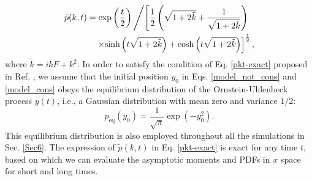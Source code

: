 \documentclass[aps,pre,twocolumn,groupedaddress,longbibliography]{revtex4-2}
\begin{document}
\begin{equation}\label{pkt-exact}
\begin{split}
    \tilde{p}(k,t)&=\exp\left(\frac{t}{2}\right)\left/\left[\frac{1}{2}\left(\sqrt{1+2\tilde{k}}+\frac{1}{\sqrt{1+2\tilde{k}}}\right)\right.\right.\\
&~~~\left.\times\textrm{sinh}\left(t\sqrt{1+2\tilde{k}}\right)
+\textrm{cosh}\left(t\sqrt{1+2\tilde{k}}\right)\right]^{\frac{1}{2}},
\end{split}
\end{equation}
where $\tilde{k}=ikF+k^2$. In order to satisfy the condition of Eq. \eqref{pkt-exact} proposed in Ref. \cite{Dankel:1991}, we assume that the initial position $y_0$ in Eqs. \eqref{model_not_cons} and \eqref{model_cons} obeys the equilibrium distribution of the Ornstein-Uhlenbeck process $y(t)$, i.e., a Gaussian distribution with mean zero and variance $1/2$:
\begin{equation}\label{EquilibriumDistribution}
  p_{\textrm{eq}}(y_0)=\frac{1}{\sqrt{\pi}}\exp(-y_0^2).
\end{equation}
This equilibrium distribution is also employed throughout all the simulations in Sec. \ref{Sec6}.
The expression of $\tilde{p}(k,t)$ in Eq. \eqref{pkt-exact} is exact for any time $t$, based on which we can evaluate the asymptotic moments and PDFs in $x$ space for short and long times.
\end{document}
